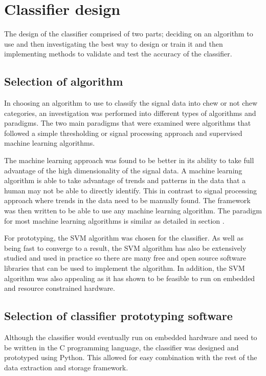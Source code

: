 \section{Classifier design}

The design of the classifier comprised of two parts; deciding on an algorithm to use and then investigating the best way to design or train it and then implementing methods to validate and test the accuracy of the classifier.  

\subsection{Selection of algorithm}

In choosing an algorithm to use to classify the signal data into chew or not chew categories, an investigation was performed into different types of algorithms and paradigms. The two main paradigms that were examined were algorithms that followed a simple thresholding or signal processing approach and supervised machine learning algorithms. 

The machine learning approach was found to be better in its ability to take full advantage of the high dimensionality of the signal data. A machine learning algorithm is able to take advantage of trends and patterns in the data that a human may not be able to directly identify. This in contrast to signal processing approach where trends in the data need to be manually found. The framework was then written to be able to use any machine learning algorithm. The paradigm for most machine learning algorithms is similar as detailed in section \label{classifierframework}.

For prototyping, the SVM algorithm was chosen for the classifier. As well as being fast to converge to a result, the SVM algorithm has also be extensively studied and used in practice so there are many free and open source software libraries that can be used to implement the algorithm. In addition, the SVM algorithm was also appealing as it has shown to be feasible to run on embedded and resource constrained hardware. 

\subsection{Selection of classifier prototyping software}

Although the classifier would eventually run on embedded hardware and need to be written in the C programming language, the classifier was designed and prototyped using Python. This allowed for easy combination with the rest of the data extraction and storage framework. 


